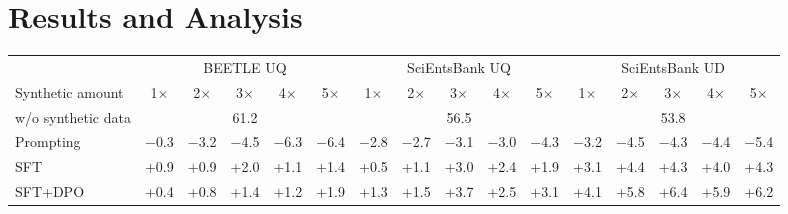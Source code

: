 \section{Results and Analysis}
\label{sec:results}

\begin{table}[t]
\centering
\small
\setlength{\tabcolsep}{3.6pt}
\begin{tabular}{lccccccccccccccc}
\toprule
 & \multicolumn{5}{c}{BEETLE UQ} & \multicolumn{5}{c}{SciEntsBank UQ} & \multicolumn{5}{c}{SciEntsBank UD} \\
\cmidrule(lr){2-6}\cmidrule(lr){7-11}\cmidrule(lr){12-16}
Synthetic amount & 1$\times$ & 2$\times$ & 3$\times$ & 4$\times$ & 5$\times$ & 1$\times$ & 2$\times$ & 3$\times$ & 4$\times$ & 5$\times$ & 1$\times$ & 2$\times$ & 3$\times$ & 4$\times$ & 5$\times$ \\
\midrule
w/o synthetic data & \multicolumn{5}{c}{61.2} & \multicolumn{5}{c}{56.5} & \multicolumn{5}{c}{53.8} \\
\midrule
Prompting & $-$0.3 & \cellcolor{BrickRed!18}$-$3.2 & \cellcolor{BrickRed!26}$-$4.5 & \cellcolor{BrickRed!35}$-$6.3 & \cellcolor{BrickRed!36}$-$6.4 & \cellcolor{BrickRed!16}$-$2.8 & \cellcolor{BrickRed!15}$-$2.7 & \cellcolor{BrickRed!18}$-$3.1 & \cellcolor{BrickRed!17}$-$3.0 & \cellcolor{BrickRed!24}$-$4.3 & \cellcolor{BrickRed!18}$-$3.2 & \cellcolor{BrickRed!25}$-$4.5 & \cellcolor{BrickRed!24}$-$4.3 & \cellcolor{BrickRed!25}$-$4.4 & \cellcolor{BrickRed!30}$-$5.4 \\
SFT & \cellcolor{Cerulean!5}+0.9 & \cellcolor{Cerulean!5}+0.9 & \cellcolor{Cerulean!11}+2.0 & \cellcolor{Cerulean!6}+1.1 & \cellcolor{Cerulean!8}+1.4 & \cellcolor{Cerulean!3}+0.5 & \cellcolor{Cerulean!6}+1.1 & \cellcolor{Cerulean!17}+3.0 & \cellcolor{Cerulean!13}+2.4 & \cellcolor{Cerulean!10}+1.9 & \cellcolor{Cerulean!18}+3.1 & \cellcolor{Cerulean!25}+4.4 & \cellcolor{Cerulean!24}+4.3 & \cellcolor{Cerulean!23}+4.0 & \cellcolor{Cerulean!24}+4.3 \\
SFT+DPO & +0.4 & \cellcolor{Cerulean!4}+0.8 & \cellcolor{Cerulean!8}+1.4 & \cellcolor{Cerulean!7}+1.2 & \cellcolor{Cerulean!11}+1.9 & \cellcolor{Cerulean!7}+1.3 & \cellcolor{Cerulean!9}+1.5 & \cellcolor{Cerulean!21}+3.7 & \cellcolor{Cerulean!14}+2.5 & \cellcolor{Cerulean!18}+3.1 & \cellcolor{Cerulean!23}+4.1 & \cellcolor{Cerulean!33}+5.8 & \cellcolor{Cerulean!36}+6.4 & \cellcolor{Cerulean!33}+5.9 & \cellcolor{Cerulean!35}+6.2 \\

\end{tabular}
\end{table}
